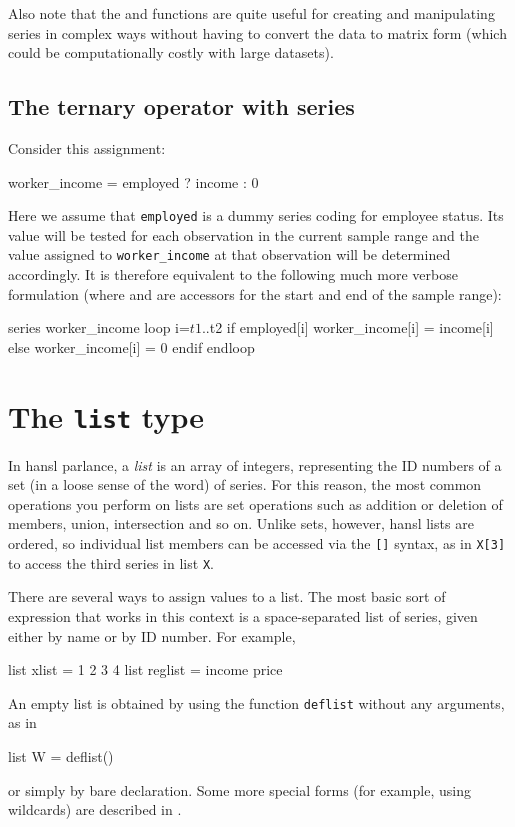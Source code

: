 Also note that the  and  functions are quite
useful for creating and manipulating series in complex ways without
having to convert the data to matrix form (which could be
computationally costly with large datasets).

\subsection{The ternary operator with series}

Consider this assignment:

\begin{code}
  worker_income = employed ? income : 0
\end{code}

Here we assume that \texttt{employed} is a dummy series coding for
employee status. Its value will be tested for each observation in the
current sample range and the value assigned to \texttt{worker\_income}
at that observation will be determined accordingly. It is therefore
equivalent to the following much more verbose formulation (where
 and  are accessors for the start and end of the
sample range):
\begin{code}
series worker_income
loop i=$t1..$t2
    if employed[i]
        worker_income[i] = income[i]
    else
        worker_income[i] = 0
    endif
endloop
\end{code}

\section{The \texttt{list} type}
\label{sec:lists}
 
In hansl parlance, a \textit{list} is an array of integers,
representing the ID numbers of a set (in a loose sense of the word) of
series.  For this reason, the most common operations you perform on
lists are set operations such as addition or deletion of members,
union, intersection and so on. Unlike sets, however, hansl lists are
ordered, so individual list members can be accessed via the
\texttt{[]} syntax, as in \texttt{X[3]} to access the third series in
list \texttt{X}.

There are several ways to assign values to a list.  The most basic
sort of expression that works in this context is a space-separated
list of series, given either by name or by ID number.  For example,
\begin{code}
list xlist = 1 2 3 4
list reglist = income price 
\end{code}
An empty list is obtained by using the function \texttt{deflist}
without any arguments, as in
\begin{code}
list W = deflist()  
\end{code}
or simply by bare declaration. Some more special forms (for example,
using wildcards) are described in \GUG.

